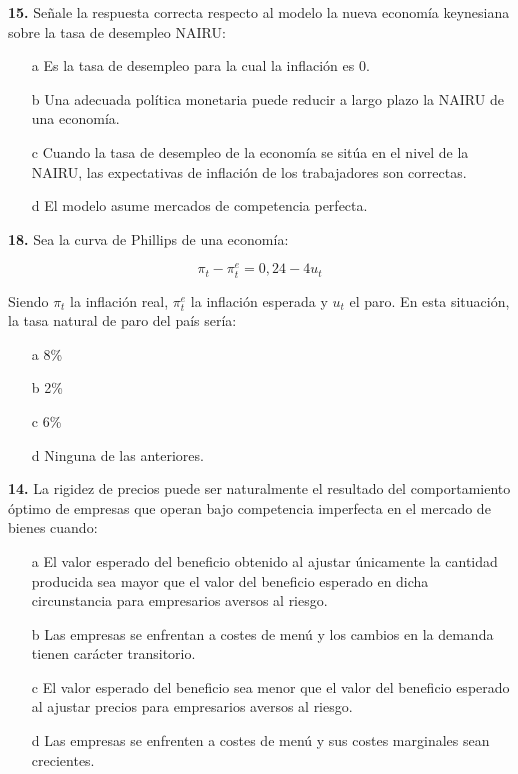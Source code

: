 \documentclass{nuevotema}
\begin{document}
\textbf{15.} Señale la respuesta correcta respecto al modelo la nueva economía keynesiana sobre la tasa de desempleo NAIRU:
\begin{itemize}
	\item[a] Es la tasa de desempleo para la cual la inflación es 0.
	\item[b] Una adecuada política monetaria puede reducir a largo plazo la NAIRU de una economía.
	\item[c] Cuando la tasa de desempleo de la economía se sitúa en el nivel de la NAIRU, las expectativas de inflación de los trabajadores son correctas.
	\item[d] El modelo asume mercados de competencia perfecta.
\end{itemize}

\textbf{18.} Sea la curva de Phillips de una economía:

\begin{equation}
\pi_t - \pi_t^e = 0,24 - 4u_t
\end{equation}

Siendo $\pi_t$ la inflación real, $\pi_t^e$ la inflación esperada y $u_t$ el paro. En esta situación, la tasa natural de paro del país sería:

\begin{itemize}
	\item[a] 8\%
	\item[b] 2\%
	\item[c] 6\%
	\item[d] Ninguna de las anteriores.
\end{itemize}

\textbf{14.} La rigidez de precios puede ser naturalmente el resultado del comportamiento óptimo de empresas que operan bajo competencia imperfecta en el mercado de bienes cuando:

\begin{itemize}
	\item[a] El valor esperado del beneficio obtenido al ajustar únicamente la cantidad producida sea mayor que el valor del beneficio esperado en dicha circunstancia para empresarios aversos al riesgo.
	\item[b] Las empresas se enfrentan a costes de menú y los cambios en la demanda tienen carácter transitorio.
	\item[c] El valor esperado del beneficio sea menor que el valor del beneficio esperado al ajustar precios para empresarios aversos al riesgo.
	\item[d] Las empresas se enfrenten a costes de menú y sus costes marginales sean crecientes.
\end{itemize}
\end{document}
